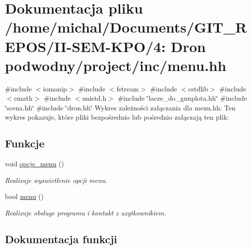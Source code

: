 \hypertarget{menu_8hh}{}\section{Dokumentacja pliku /home/michal/\+Documents/\+G\+I\+T\+\_\+\+R\+E\+P\+O\+S/\+I\+I-\/\+S\+E\+M-\/\+K\+P\+O/4\+: Dron podwodny/project/inc/menu.hh}
\label{menu_8hh}
{\ttfamily \#include $<$iomanip$>$}\newline
{\ttfamily \#include $<$fstream$>$}\newline
{\ttfamily \#include $<$cstdlib$>$}\newline
{\ttfamily \#include $<$cmath$>$}\newline
{\ttfamily \#include $<$unistd.\+h$>$}\newline
{\ttfamily \#include \char`\"{}lacze\+\_\+do\+\_\+gnuplota.\+hh\char`\"{}}\newline
{\ttfamily \#include \char`\"{}scena.\+hh\char`\"{}}\newline
{\ttfamily \#include \char`\"{}dron.\+hh\char`\"{}}\newline
Wykres zależności załączania dla menu.\+hh\+:
Ten wykres pokazuje, które pliki bezpośrednio lub pośrednio załączają ten plik\+:
\subsection*{Funkcje}
\begin{DoxyCompactItemize}
\item 
void \hyperlink{menu_8hh_a882986fc86f906fa55f5f57e364dc748}{opcje\+\_\+menu} ()
\begin{DoxyCompactList}\small\item\em Realizuje wyswietlenie opcji menu. \end{DoxyCompactList}\item 
bool \hyperlink{menu_8hh_a40367ec6ab7c61ae3bdef5ec38d0becc}{menu} ()
\begin{DoxyCompactList}\small\item\em Realizuje obsluge programu i kontakt z uzytkownikiem. \end{DoxyCompactList}\end{DoxyCompactItemize}


\subsection{Dokumentacja funkcji}
\mbox{\label{menu_8hh_a40367ec6ab7c61ae3bdef5ec38d0becc}} 
